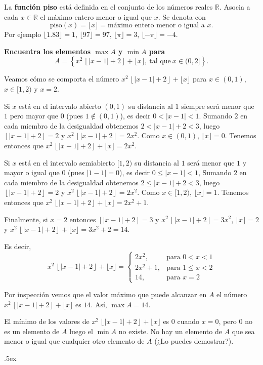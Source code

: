 \documentclass[12pt,letterpaper]{article}
\author{\textsc{Manuel López Mateos}}
\author{Manuel López Mateos}
\newcommand{\fej}{\relax\hfill\ifmmode{\lower.5ex\hbox{{\textcolor{blue}{\LARGE\smiley al 15pt}}}}\else\lower.5ex\hbox{{\textcolor{blue}{\LARGE \smiley}}}}  %
\begin{document}
\noindent La {\color{purple}\textbf{función piso}} está definida en el conjunto de los números reales $\mathbb R$. Asocia a cada $x\in \mathbb{R}$ el máximo entero menor o igual que $x$. Se denota con
$$\text{piso}(x)=\lfloor x\rfloor=\text{máximo entero menor o igual a $x$}.$$ 
Por ejemplo $\lfloor 1.83\rfloor=1$, $\lfloor 97\rfloor=97$, $\lfloor\pi\rfloor=3$, $\lfloor-\pi\rfloor=-4$.

\bigskip
\noindent \textbf{Encuentra los elementos $\max A$ y $\min A$ para }
$$A=\left\{x^2\,\left\lfloor|x-1|+2\right\rfloor+\lfloor x\rfloor,\ \text{tal que}\ x\in(0,2]\right\}.$$

Veamos cómo se comporta el número $x^2\,\left\lfloor|x-1|+2\right\rfloor+\lfloor x\rfloor$ para $x\in(0,1)$, $x\in[1,2)$ y $x=2$.

Si $x$ está en el intervalo abierto $(0,1)$ su distancia al $1$ siempre será menor que $1$ pero mayor que $0$ (pues $1\notin(0,1)$), es decir $0<|x-1|<1$. Sumando $2$ en cada miembro de la desigualdad obtenemos $2<|x-1|+2<3$, luego $\left\lfloor|x-1|+2\right\rfloor=2$ y $x^2\,\left\lfloor|x-1|+2\right\rfloor=2x^2$. Como $x\in(0,1)$, $\lfloor x\rfloor=0$. Tenemos entonces que $x^2\,\left\lfloor|x-1|+2\right\rfloor+\lfloor x\rfloor=2x^2$.

Si $x$ está en el intervalo semiabierto $[1,2)$ su distancia al $1$ será menor que $1$ y mayor o igual que $0$ (pues $|1-1|=0$), es decir $0\leq|x-1|<1$, Sumando $2$ en cada miembro de la desigualdad obtenemos $2\leq|x-1|+2<3$, luego $\left\lfloor|x-1|+2\right\rfloor=2$ y $x^2\,\left\lfloor|x-1|+2\right\rfloor=2x^2$. Como $x\in[1,2)$, $\lfloor x\rfloor=1$. Tenemos entonces que $x^2\,\left\lfloor|x-1|+2\right\rfloor+\lfloor x\rfloor=2x^2+1$.

Finalmente, si $x=2$ entonces $\left\lfloor|x-1|+2\right\rfloor=3$ y 
$x^2\,\left\lfloor|x-1|+2\right\rfloor=3x^2$, $\lfloor x\rfloor=2$ y 
$x^2\,\left\lfloor|x-1|+2\right\rfloor+\lfloor x\rfloor=3x^2+2=14$.

Es decir,
  \[
    x^2\,\left\lfloor|x-1|+2\right\rfloor+\lfloor x\rfloor = \left\{\begin{array}{ll}
        2x^2, & \text{para } 0< x< 1\\
        2x^2+1, & \text{para } 1\leq x< 2\\
        14, & \text{para } x=2
        \end{array}\right.
  \]
  
  Por inspección vemos que el valor máximo que puede alcanzar en $A$ el número $x^2\,\left\lfloor|x-1|+2\right\rfloor+\lfloor x\rfloor$  es $14$. Así, $\max A=14$.

El mínimo de los valores de $x^2\,\left\lfloor|x-1|+2\right\rfloor+\lfloor x\rfloor$  es $0$ cuando $x=0$, pero $0$ no es un elemento de $A$ luego el $\min A$ no existe. No hay un elemento de $A$ que sea menor o igual que cualquier otro elemento de $A$ (¿Lo puedes demostrar?).

\fej
  
\end{document}
